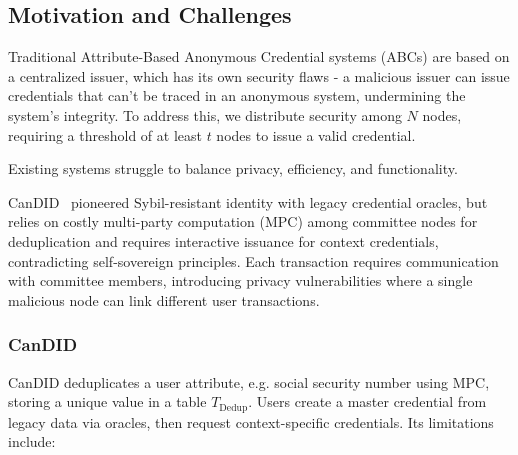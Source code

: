 \subsection{Motivation and Challenges}

Traditional Attribute-Based Anonymous Credential systems (ABCs) are based on a centralized issuer, which has its own security flaws - a malicious issuer can issue credentials that can't be traced in an anonymous system, undermining the system's integrity. To address this, we distribute security among $N$ nodes, requiring a threshold of at least $t$ nodes to issue a valid credential. 

Existing systems struggle to balance privacy, efficiency, and functionality. 

CanDID~\cite{maram_candid_2020} pioneered Sybil-resistant identity with legacy credential oracles, but relies on costly multi-party computation (MPC) among committee nodes for deduplication and requires interactive issuance for context credentials, contradicting self-sovereign principles. Each transaction requires communication with committee members, introducing privacy vulnerabilities where a single malicious node can link different user transactions.

\subsubsection*{CanDID}
CanDID deduplicates a user attribute, e.g. social security number using MPC, storing a unique value in a table $T_{\text{Dedup}}$. Users create a master credential from legacy data via oracles, then request context-specific credentials. Its limitations include:

